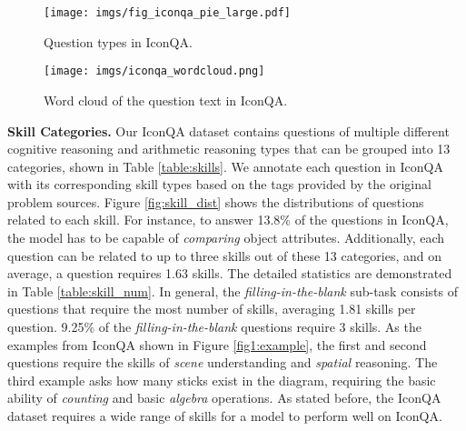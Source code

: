\documentclass{article}
\begin{document}
\begin{figure}[ht]
    \vspace{-1mm}
    \begin{minipage}{0.39\linewidth}  
        \centering 
\texttt{[image: imgs/fig\_iconqa\_pie\_large.pdf]}
\caption{Question types in IconQA.}
        \label{fig:question_pie}
	\end{minipage}
	\hfill
	\begin{minipage}{0.60\linewidth}  
        \centering 
        \texttt{[image: imgs/iconqa\_wordcloud.png]}
\caption{Word cloud of the question text in IconQA.}
        \label{fig:wordcloud}
    \end{minipage}
    \vspace{-1mm}
\end{figure}


\textbf{Skill Categories.} Our IconQA dataset contains questions of multiple different cognitive reasoning and arithmetic reasoning types that can be grouped into 13 categories, shown in Table \ref{table:skills}. We annotate each question in IconQA with its corresponding skill types based on the tags provided by the original problem sources. Figure \ref{fig:skill_dist} shows the distributions of questions related to each skill. For instance, to answer 13.8\% of the questions in IconQA, the model has to be capable of \textit{comparing} object attributes. Additionally, each question can be related to up to three skills out of these 13 categories, and on average, a question requires 1.63 skills. The detailed statistics are demonstrated in Table \ref{table:skill_num}. In general, the \textit{filling-in-the-blank} sub-task consists of questions that require the most number of skills, averaging 1.81 skills per question. 9.25\% of the \textit{filling-in-the-blank} questions require 3 skills. As the examples from IconQA shown in Figure \ref{fig1:example}, the first and second questions require the skills  of \textit{scene} understanding and \textit{spatial} reasoning. The third example asks how many sticks exist in the diagram, requiring the basic ability of \textit{counting} and basic \textit{algebra} operations. As stated before, the IconQA dataset requires a wide range of skills for a model to perform well on IconQA. 
\end{document}
